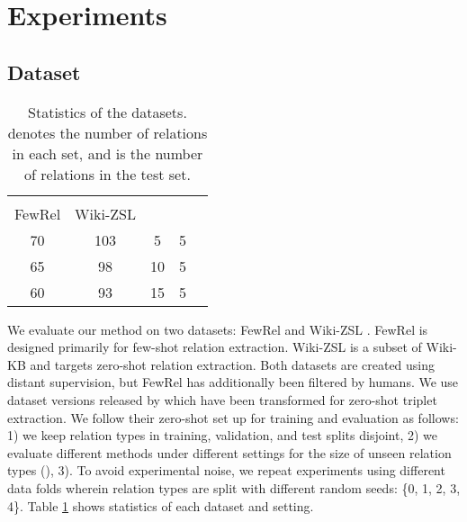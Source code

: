 \section{Experiments}

\subsection{Dataset}

\begin{table}[t]
    \centering
    \small
    \begin{tabular}{ccccc}
    \toprule
          \multicolumn{2}{c}{}  &  &  \\
          FewRel  & Wiki-ZSL & \multicolumn{2}{c}{} & \\ \midrule
         70  & 103 & 5 & 5  \\
         65  & 98 & 10 & 5  \\
         60  & 93 & 15 & 5  \\ \bottomrule
    \end{tabular}
    \caption{Statistics of the datasets.  denotes the number of relations in each set, and  is the number of relations in the test set.}
    \label{tab:stat_data}
\end{table}

We evaluate our method on two datasets: FewRel \citep{han-etal-2018-fewrel} and Wiki-ZSL \citep{chen-li-2021-zs}. FewRel is designed primarily for few-shot relation extraction. Wiki-ZSL is a subset of Wiki-KB and targets zero-shot relation extraction. Both datasets are created using distant supervision, but FewRel has  additionally been filtered by humans.
We use dataset versions released by \citet{chia-etal-2022-relationprompt} which have been transformed for zero-shot triplet extraction.
We follow their zero-shot set up for training and evaluation as follows:
1) we keep relation types in training, validation, and test splits disjoint, 2) we evaluate different methods under different settings for the size of unseen relation types (), 3). To avoid experimental noise, we repeat experiments using different data folds wherein relation types are split with different random seeds: \{0, 1, 2, 3, 4\}. 
Table \ref{tab:stat_data} shows statistics of each dataset and setting.


